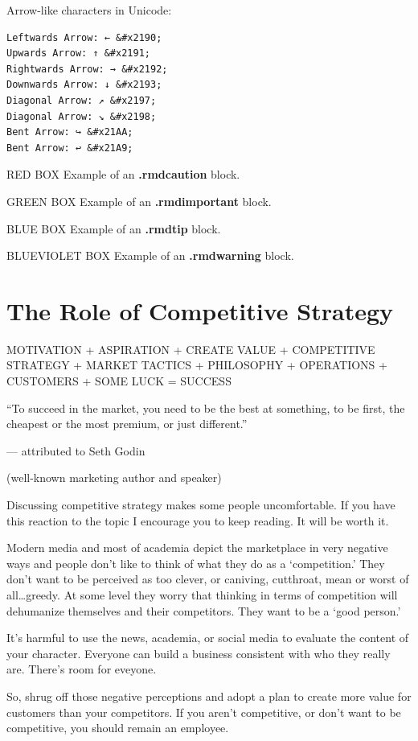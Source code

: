 \documentclass[
]{book}
\begin{document}
Arrow-like characters in Unicode:

\begin{verbatim}
Leftwards Arrow: ← &#x2190;
Upwards Arrow: ↑ &#x2191;
Rightwards Arrow: → &#x2192;
Downwards Arrow: ↓ &#x2193;
Diagonal Arrow: ↗ &#x2197;
Diagonal Arrow: ↘ &#x2198;
Bent Arrow: ↪ &#x21AA;
Bent Arrow: ↩ &#x21A9;
\end{verbatim}

RED BOX Example of an \textbf{.rmdcaution} block.

GREEN BOX Example of an \textbf{.rmdimportant} block.

BLUE BOX Example of an \textbf{.rmdtip} block.

BLUEVIOLET BOX Example of an \textbf{.rmdwarning} block.

\hypertarget{the-role-of-competitive-strategy}{%
\chapter{The Role of Competitive Strategy}\label{the-role-of-competitive-strategy}}

{MOTIVATION}
{+}
{ASPIRATION}
{+}
{CREATE VALUE}
{+}
{COMPETITIVE STRATEGY }
{+}
{MARKET TACTICS}
{+}
{PHILOSOPHY}
{+}
{OPERATIONS}
{+}
{CUSTOMERS}
{+}
{SOME LUCK}
{=}
{SUCCESS}

``To succeed in the market, you need to be the best at something, to be first, the cheapest or the most premium, or just different.''

--- attributed to Seth Godin

(well-known marketing author and speaker)

Discussing competitive strategy makes some people uncomfortable. If you have this reaction to the topic I encourage you to keep reading. It will be worth it.

Modern media and most of academia depict the marketplace in very negative ways and people don't like to think of what they do as a `competition.' They don't want to be perceived as too clever, or caniving, cutthroat, mean or worst of all\ldots greedy. At some level they worry that thinking in terms of competition will dehumanize themselves and their competitors. They want to be a `good person.'

It's harmful to use the news, academia, or social media to evaluate the content of your character. Everyone can build a business consistent with who they really are. There's room for eveyone.

So, shrug off those negative perceptions and adopt a plan to create more value for customers than your competitors. If you aren't competitive, or don't want to be competitive, you should remain an employee.
\end{document}
